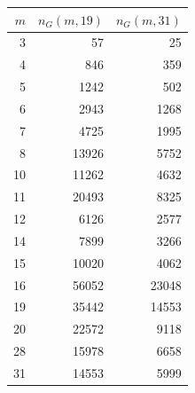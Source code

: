 \begin{center}\begin{tabular}{r|rr}\toprule
$m$&$n_G(m,19)$&$n_G(m,31)$\\\midrule
3&57&25\\
4&846&359\\
5&1242&502\\
6&2943&1268\\
7&4725&1995\\
8&13926&5752\\
10&11262&4632\\
11&20493&8325\\
12&6126&2577\\
14&7899&3266\\
15&10020&4062\\
16&56052&23048\\
19&35442&14553\\
20&22572&9118\\
28&15978&6658\\
31&14553&5999\\
\bottomrule\end{tabular}\end{center}
